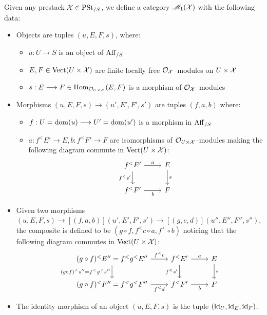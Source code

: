 \documentclass[11pt]{amsart}
\begin{document}
\begin{cns}\label{cns:mod-prest-arr-bun}
Given any prestack $\mathcal{X} \in \mathrm{PSt}_{/S}$, we define a category
$\mathscr{M}_1(\mathcal{X})$ with the following data:
\begin{itemize}
\item Objects are tuples $(u, E, F, s)$, where:
  \begin{itemize}
  \item $u : U \to S$ is an object of $\mathrm{Aff}_{/S}$
  \item $E, F \in \mathrm{Vect}(U \times \mathcal{X})$ are finite locally free
    $\mathcal{O}_\mathcal{X}$--modules on $U \times \mathcal{X}$
  \item $s : E \to F \in \Hom_{\mcO_{U \times \mcX}}(E, F)$ is a morphism of
    $\mathcal{O}_\mathcal{X}$--modules
  \end{itemize}
\item Morphisms $(u, E, F, s) \to (u', E', F', s')$ are tuples
$(f, a, b)$ where:
  \begin{itemize}
  \item $f : U = \dom(u) \to U' = \dom(u')$ is a morphism in $\mathrm{Aff}_{/S}$
  \item $a : f^<E' \to E, b : f^<F' \to F$ are isomorphisms of
  $\mathcal{O}_{U \times \mathcal{X}}$--modules making the following diagram commute in
  $\mathrm{Vect}(U \times \mathcal{X})$:
  \[\begin{tikzcd}
  f^<E' \ar[r, "a"] \ar[d, "f^<s'" left] & E \ar[d, "s"] \\
  f^<F' \ar[r, "b" below] & F
  \end{tikzcd}\]
  \end{itemize}
\item Given two morphisms
$(u, E, F, s) \to[{(f, a, b)}] (u', E', F', s') \to[{(g, c, d)}]
(u'', E'', F'', s'')$, the composite is defined to be
$(g \circ f, f^<c \circ a, f^< \circ b)$ noticing that the following
diagram commutes in $\mathrm{Vect}(U \times \mathcal{X})$:
  \[\begin{tikzcd}
  (g \circ f)^<E'' = f^<g^<E''
    \ar[r, "f^<c"]
    \ar[d, "{(g \circ f)^<s''} = f^<g^<s''" left] &
  f^<E' \ar[r, "a"] \ar[d, "f^<s'" left] &
  E \ar[d, "s"] \\
  (g \circ f)^<F'' = f^<g^<F'' \ar[r, "f^<d" below] &
  f^<F' \ar[r, "b" below] &
  F
  \end{tikzcd}\]
\item The identity morphism of an object $(u, E, F, s)$ is the tuple
$(\mathrm{id}_U, \mathrm{id}_E, \mathrm{id}_F)$.
\end{itemize}
\end{cns}
\end{document}
